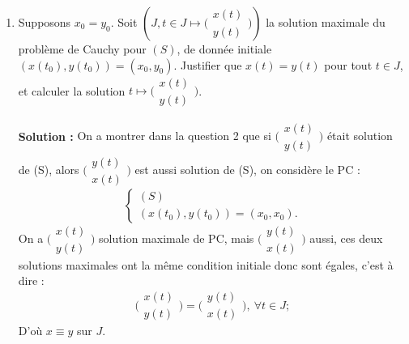 \documentclass[12pt,a4paper]{article}
\newcommand{\solution}[1]{\par\noindent\textbf{\color{OliveGreen}Solution :} \textcolor{OliveGreen}{#1}}
\begin{document}
\begin{exo}
\begin{enumerate}
    \item Supposons $x_0=y_0$. Soit $\left(J,t\in J\mapsto \Big(\begin{array}{c}x(t)\\y(t)\end{array}\Big)\right)$ la solution maximale du problème de Cauchy pour $(S)$, de donnée initiale $(x(t_0),y(t_0))=(x_0,y_0)$. Justifier que $x(t)=y(t)$ pour tout $t\in J$, et calculer la solution $t\mapsto\Big(\begin{array}{c}x(t)\\y(t)\end{array}\Big)$.
		    \solution{On a montrer dans la question 2 que si $\Big(\begin{array}{c}x(t)\\y(t)\end{array}\Big)$ était solution de (S), alors $\Big(\begin{array}{c}y(t)\\x(t)\end{array}\Big)$ est aussi solution de (S), on considère le PC : 
 $$
\begin{cases}
	(S)\\
	(x(t_0),y(t_0)) = (x_0,x_0).
\end{cases}
$$
		 On a  $\Big(\begin{array}{c}x(t)\\y(t)\end{array}\Big)$ solution maximale de PC, mais  $\Big(\begin{array}{c}y(t)\\x(t)\end{array}\Big)$ aussi, ces deux solutions maximales ont la même condition initiale donc sont égales, c'est à dire : 
			 $$\Big(\begin{array}{c}x(t)\\y(t)\end{array}\Big) =  \Big(\begin{array}{c}y(t)\\x(t)\end{array}\Big),~ \forall t \in J;$$
				 D'où $x\equiv y$ sur $J$.
			 }
		  
        \end{enumerate}
\end{exo}
\end{document}

